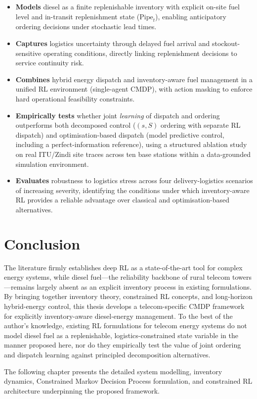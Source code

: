 \begin{itemize}
    \item \textbf{Models} diesel as a finite replenishable inventory with
    explicit on-site fuel level and in-transit replenishment state
    ($\mathrm{Pipe}_t$), enabling anticipatory ordering decisions under
    stochastic lead times.

    \item \textbf{Captures} logistics uncertainty through delayed fuel
    arrival and stockout-sensitive operating conditions, directly linking
    replenishment decisions to service continuity risk.

    \item \textbf{Combines} hybrid energy dispatch and inventory-aware
    fuel management in a unified RL environment (single-agent CMDP),
    with action masking to enforce hard operational feasibility constraints.

    \item \textbf{Empirically tests} whether joint \emph{learning} of
    dispatch and ordering outperforms both decomposed control
    ($(s,S)$ ordering with separate RL dispatch) and
    optimisation-based dispatch (model predictive control, including a
    perfect-information reference), using a structured ablation study on
    real ITU/Zindi site traces across ten base stations within a
    data-grounded simulation environment.

    \item \textbf{Evaluates} robustness to logistics stress across four
    delivery-logistics scenarios of increasing severity, identifying the
    conditions under which inventory-aware RL provides a reliable
    advantage over classical and optimisation-based alternatives.
\end{itemize}

\section{Conclusion}

The literature firmly establishes deep RL as a state-of-the-art tool for
complex energy systems, while diesel fuel---the reliability backbone of
rural telecom towers---remains largely absent as an explicit inventory
process in existing formulations.
By bringing together inventory theory, constrained RL concepts, and long-horizon
hybrid-energy control, this thesis develops a telecom-specific CMDP
framework for explicitly inventory-aware diesel-energy management.  To
the best of the author's knowledge, existing RL formulations for telecom
energy systems do not model diesel fuel as a replenishable,
logistics-constrained state variable in the manner proposed here, nor do
they empirically test the value of joint ordering and dispatch learning
against principled decomposition alternatives.

The following chapter presents the detailed system modelling, inventory
dynamics, Constrained Markov Decision Process formulation, and constrained
RL architecture underpinning the proposed framework.
\clearpage